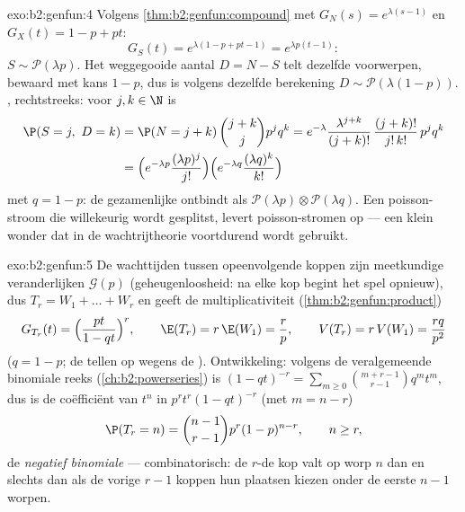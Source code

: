 \begin{solution}{exo:b2:genfun:4}
Volgens \cref{thm:b2:genfun:compound} met $G_N(s) =
e^{\lambda(s-1)}$ en $G_X(t) = 1 - p + pt$:
\[
G_S(t) = e^{\lambda(1 - p + pt - 1)} = e^{\lambda p(t - 1)} :
\]
$S \sim \mathcal{P}(\lambda p)$. Het weggegooide aantal $D = N - S$
telt dezelfde voorwerpen, bewaard met kans $1 - p$, dus is volgens
dezelfde berekening $D \sim \mathcal{P}(\lambda(1 - p))$.
, rechtstreeks: voor $j, k \in \N$ is
\begin{align*}
\P(S = j,\ D = k)
&= \P(N = j + k)\,\binom{j+k}{j}p^jq^k
= e^{-\lambda}\frac{\lambda^{j+k}}{(j+k)!}\,
\frac{(j+k)!}{j!\,k!}\,p^jq^k\\
&= \Bigl(e^{-\lambda p}\frac{(\lambda p)^j}{j!}\Bigr)
\Bigl(e^{-\lambda q}\frac{(\lambda q)^k}{k!}\Bigr)
\end{align*}
met $q = 1 - p$: de gezamenlijke  ontbindt als
$\mathcal{P}(\lambda p) \otimes \mathcal{P}(\lambda q)$. Een
poisson-stroom die willekeurig wordt gesplitst, levert
\emph{} poisson-stromen op --- een klein wonder dat
in de wachtrijtheorie voortdurend wordt gebruikt.
\end{solution}

\begin{solution}{exo:b2:genfun:5}
De wachttijden tussen opeenvolgende koppen zijn 
meetkundige veranderlijken $\mathcal{G}(p)$ (geheugenloosheid: na
elke kop begint het spel opnieuw), dus $T_r = W_1 + \dots + W_r$ en
geeft de multiplicativiteit (\cref{thm:b2:genfun:product})
\[
G_{T_r}(t) = \Bigl(\frac{pt}{1 - qt}\Bigr)^{r},
\qquad
\E(T_r) = r\,\E(W_1) = \frac rp,
\qquad
V(T_r) = r\,V(W_1) = \frac{rq}{p^2}
\]
($q = 1 - p$; de  tellen op wegens de ).
Ontwikkeling: volgens de veralgemeende binomiale reeks
(\cref{ch:b2:powerseries}) is $(1 - qt)^{-r} = \sum_{m\geq0}
\binom{m + r - 1}{r - 1}q^mt^m$, dus is de coëfficiënt van $t^n$ in
$p^rt^r(1 - qt)^{-r}$ (met $m = n - r$)
\[
\P(T_r = n) = \binom{n-1}{r-1}p^r(1-p)^{n-r},
\qquad n \geq r ,
\]
de \emph{negatief binomiale}  --- combinatorisch: de
$r$-de kop valt op worp $n$ dan en slechts dan als de vorige $r -
1$ koppen hun plaatsen kiezen onder de eerste $n - 1$ worpen.
\end{solution}

